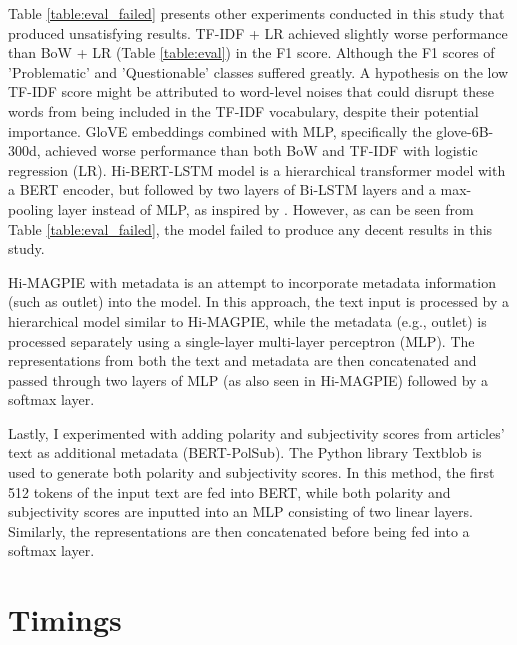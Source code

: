 Table \ref{table:eval_failed} presents other experiments conducted in this study that produced unsatisfying results. TF-IDF + LR achieved slightly worse performance than BoW + LR (Table \ref{table:eval}) in the F1 score. Although the F1 scores of 'Problematic' and 'Questionable' classes suffered greatly. A hypothesis on the low TF-IDF score might be attributed to word-level noises that could disrupt these words from being included in the TF-IDF vocabulary, despite their potential importance. GloVE embeddings combined with MLP, specifically the glove-6B-300d, achieved worse performance than both BoW and TF-IDF with logistic regression (LR). Hi-BERT-LSTM model is a hierarchical transformer model with a BERT encoder, but followed by two layers of Bi-LSTM layers and a max-pooling layer instead of MLP, as inspired by \cite{khandve-2022-hierarchical-longdoc}. However, as can be seen from Table \ref{table:eval_failed}, the model failed to produce any decent results in this study.

Hi-MAGPIE with metadata is an attempt to incorporate metadata information (such as outlet) into the model. In this approach, the text input is processed by a hierarchical model similar to Hi-MAGPIE, while the metadata (e.g., outlet) is processed separately using a single-layer multi-layer perceptron (MLP). The representations from both the text and metadata are then concatenated and passed through two layers of MLP (as also seen in Hi-MAGPIE) followed by a softmax layer.

Lastly, I experimented with adding polarity and subjectivity scores from articles' text as additional metadata (BERT-PolSub). The Python library Textblob \cite{loria-2018-textblob} is used to generate both polarity and subjectivity scores. In this method, the first 512 tokens of the input text are fed into BERT, while both polarity and subjectivity scores are inputted into an MLP consisting of two linear layers. Similarly, the representations are then concatenated before being fed into a softmax layer.

\section{Timings}

